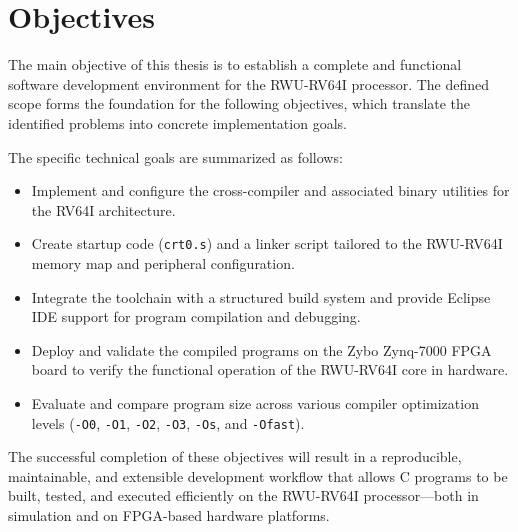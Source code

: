 \section{Objectives}
The main objective of this thesis is to establish a complete and functional software development environment for the RWU-RV64I processor. The defined scope forms the foundation for the following objectives, which translate the identified problems into concrete implementation goals.

The specific technical goals are summarized as follows:
\begin{itemize}
  \item Implement and configure the cross-compiler and associated binary utilities for the RV64I architecture.
  \item Create startup code (\texttt{crt0.s}) and a linker script tailored to the RWU-RV64I memory map and peripheral configuration.
  \item Integrate the toolchain with a structured build system and provide Eclipse IDE support for program compilation and debugging.
  \item Deploy and validate the compiled programs on the Zybo Zynq-7000 FPGA board to verify the functional operation of the RWU-RV64I core in hardware.
  \item Evaluate and compare program size across various compiler optimization levels (\texttt{-O0}, \texttt{-O1}, \texttt{-O2}, \texttt{-O3}, \texttt{-Os}, and \texttt{-Ofast}).
\end{itemize}

The successful completion of these objectives will result in a reproducible, maintainable, and extensible development workflow that allows C programs to be built, tested, and executed efficiently on the RWU-RV64I processor—both in simulation and on FPGA-based hardware platforms.
